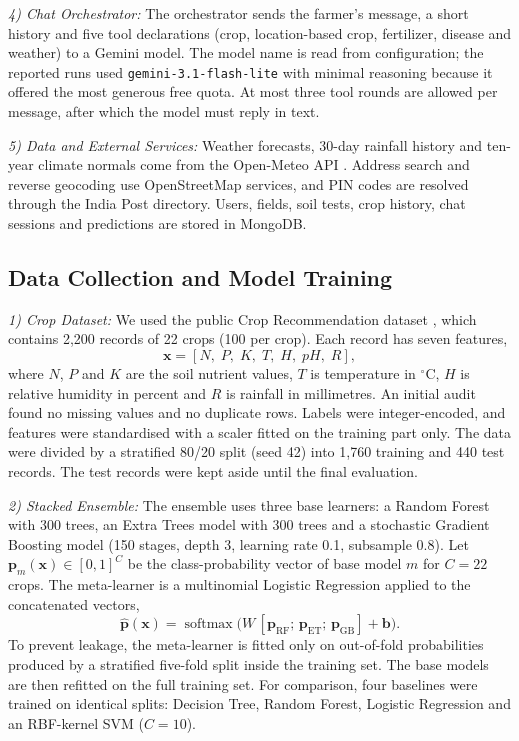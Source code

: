 \documentclass[conference]{IEEEtran}
\begin{document}
\textit{4) Chat Orchestrator:} The orchestrator sends the farmer's message, a short history and five tool declarations (crop, location-based crop, fertilizer, disease and weather) to a Gemini model. The model name is read from configuration; the reported runs used \texttt{gemini-3.1-flash-lite} with minimal reasoning because it offered the most generous free quota. At most three tool rounds are allowed per message, after which the model must reply in text.

\textit{5) Data and External Services:} Weather forecasts, 30-day rainfall history and ten-year climate normals come from the Open-Meteo API \cite{openmeteo}. Address search and reverse geocoding use OpenStreetMap services, and PIN codes are resolved through the India Post directory. Users, fields, soil tests, crop history, chat sessions and predictions are stored in MongoDB.

\subsection{Data Collection and Model Training}

\textit{1) Crop Dataset:} We used the public Crop Recommendation dataset \cite{ingle2020}, which contains 2,200 records of 22 crops (100 per crop). Each record has seven features,
\begin{equation}
\mathbf{x} = [N,\; P,\; K,\; T,\; H,\; pH,\; R],
\label{eq:x}
\end{equation}
where $N$, $P$ and $K$ are the soil nutrient values, $T$ is temperature in $^{\circ}$C, $H$ is relative humidity in percent and $R$ is rainfall in millimetres. An initial audit found no missing values and no duplicate rows. Labels were integer-encoded, and features were standardised with a scaler fitted on the training part only. The data were divided by a stratified 80/20 split (seed 42) into 1,760 training and 440 test records. The test records were kept aside until the final evaluation.

\textit{2) Stacked Ensemble:} The ensemble uses three base learners: a Random Forest with 300 trees, an Extra Trees model with 300 trees and a stochastic Gradient Boosting model (150 stages, depth 3, learning rate 0.1, subsample 0.8). Let $\mathbf{p}_m(\mathbf{x}) \in [0,1]^{C}$ be the class-probability vector of base model $m$ for $C = 22$ crops. The meta-learner is a multinomial Logistic Regression applied to the concatenated vectors,
\begin{equation}
\hat{\mathbf{p}}(\mathbf{x}) = \operatorname{softmax}\!\big(W\,[\mathbf{p}_{\mathrm{RF}};\, \mathbf{p}_{\mathrm{ET}};\, \mathbf{p}_{\mathrm{GB}}] + \mathbf{b}\big).
\label{eq:stack}
\end{equation}
To prevent leakage, the meta-learner is fitted only on out-of-fold probabilities produced by a stratified five-fold split inside the training set. The base models are then refitted on the full training set. For comparison, four baselines were trained on identical splits: Decision Tree, Random Forest, Logistic Regression and an RBF-kernel SVM ($C = 10$).
\end{document}
